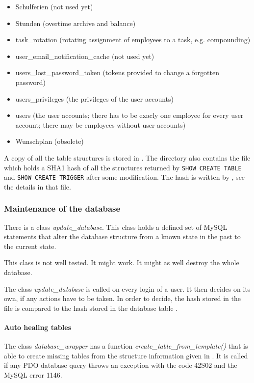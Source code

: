 \begin{itemize}
\item Schulferien (not used yet)
\item Stunden (overtime archive and balance)
\item task\_rotation (rotating assignment of employees to a task, e.g. compounding)
\item user\_email\_notification\_cache (not used yet)
\item users\_lost\_password\_token (tokens provided to change a forgotten password)
\item users\_privileges (the privileges of the user accounts)
\item users (the user accounts; there has to be exacly one employee for every user account; there may be employees without user accounts)
\item Wunschplan (obsolete)
\end{itemize}


A copy of all the table structures is stored in .
The directory also contains the file  which holds a SHA1 hash of all 
the structures returned by \verb|SHOW CREATE TABLE| and \verb|SHOW CREATE TRIGGER| after some modification. 
The hash is written by , see the details in that file.

\subsubsection{Maintenance of the database}
There is a class \emph{update\_database}.
This class holds a defined set of MySQL statements that alter the database structure from a known state in the past to the current state.

This class is not well tested. It might work. It might as well destroy the whole database.

The class \emph{update\_database} is called on every login of a user. It then decides on its own, if any actions have to be taken.
In order to decide, the hash stored in the file  is compared to the hash stored in the database table .

\paragraph{Auto healing tables}
The class \emph{database\_wrapper} has a function \emph{create\_table\_from\_template()} that is able to create missing tables from the structure information given in . It is called if any PDO database query throws an exception with the code 42S02 and the MySQL error 1146.

